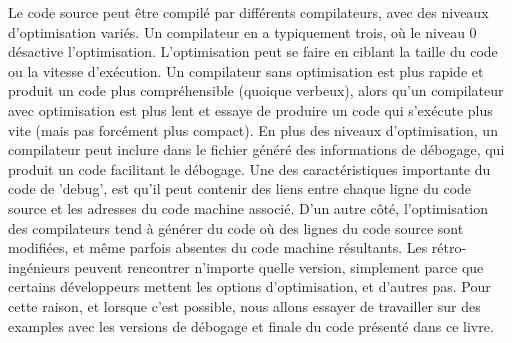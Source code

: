 Le code source peut être compilé par différents compilateurs, avec des niveaux d'optimisation variés.
Un compilateur en a typiquement trois, où le niveau 0 désactive l'optimisation.
L'optimisation peut se faire en ciblant la taille du code ou la vitesse d'exécution.
Un compilateur sans optimisation est plus rapide et produit un code plus compréhensible (quoique verbeux),
alors qu'un compilateur avec optimisation est plus lent et essaye de produire un code qui s'exécute plus 
vite (mais pas forcément plus compact).
En plus des niveaux d'optimisation, un compilateur peut inclure dans le fichier généré des informations de
débogage, qui produit un code facilitant le débogage.
Une des caractéristiques importante du code de 'debug', est qu'il peut contenir des liens entre chaque ligne du code source et
les adresses du code machine associé.
D'un autre côté, l'optimisation des compilateurs tend à générer du code où des lignes du code source sont modifiées, et
même parfois absentes du code machine résultants.
Les rétro-ingénieurs peuvent rencontrer n'importe quelle version, simplement parce que certains développeurs mettent les options
d'optimisation, et d'autres pas.
Pour cette raison, et lorsque c'est possible, nous allons essayer de travailler sur des examples avec les versions de débogage
et finale du code présenté dans ce livre.
